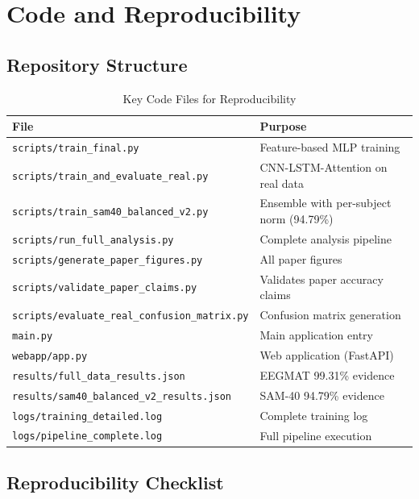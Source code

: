 \documentclass[11pt,a4paper]{article}
\begin{document}
\section{Code and Reproducibility}

\subsection{Repository Structure}

\begin{table}[H]
\centering
\caption{Key Code Files for Reproducibility}
\small
\begin{tabular}{ll}
\toprule
\textbf{File} & \textbf{Purpose} \\
\midrule
\texttt{scripts/train\_final.py} & Feature-based MLP training \\
\texttt{scripts/train\_and\_evaluate\_real.py} & CNN-LSTM-Attention on real data \\
\texttt{scripts/train\_sam40\_balanced\_v2.py} & Ensemble with per-subject norm (94.79\%) \\
\texttt{scripts/run\_full\_analysis.py} & Complete analysis pipeline \\
\texttt{scripts/generate\_paper\_figures.py} & All paper figures \\
\texttt{scripts/validate\_paper\_claims.py} & Validates paper accuracy claims \\
\texttt{scripts/evaluate\_real\_confusion\_matrix.py} & Confusion matrix generation \\
\texttt{main.py} & Main application entry \\
\texttt{webapp/app.py} & Web application (FastAPI) \\
\midrule
\texttt{results/full\_data\_results.json} & EEGMAT 99.31\% evidence \\
\texttt{results/sam40\_balanced\_v2\_results.json} & SAM-40 94.79\% evidence \\
\texttt{logs/training\_detailed.log} & Complete training log \\
\texttt{logs/pipeline\_complete.log} & Full pipeline execution \\
\bottomrule
\end{tabular}
\end{table}

\subsection{Reproducibility Checklist}
\end{document}
